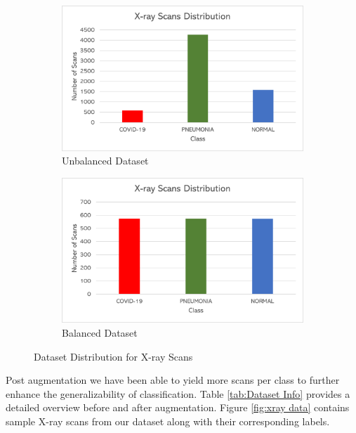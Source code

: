 \begin{figure}[H]
        \begin{subfigure}[b]{0.5\textwidth}
                \includegraphics[width=\linewidth]{Images/DatasetDistribution.png}
                \caption{Unbalanced Dataset}
                \label{fig:unbalanced}
        \end{subfigure}%
        \begin{subfigure}[b]{0.5\textwidth}
                \includegraphics[width=\linewidth]{Images/DatasetDistribution2.png}
                \caption{Balanced Dataset}
                \label{fig:balanced}
        \end{subfigure}%
        \caption{Dataset Distribution for X-ray Scans}\label{fig:dataset_dist}
\end{figure}
\vspace{-1em}
Post augmentation we have been able to yield more scans per class to further enhance the generalizability of classification. Table \ref{tab:Dataset Info} provides a detailed overview before and after augmentation. Figure \ref{fig:xray data} contains sample X-ray scans from our dataset along with their corresponding labels.

